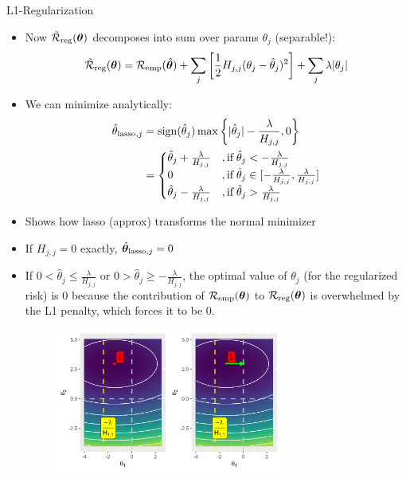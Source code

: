\documentclass[11pt,compress,t,notes=noshow, xcolor=table]{beamer}
\begin{document}
\begin{vbframe} {L1-Regularization}
\begin{itemize}
    \item Now $\mathcal{\tilde R}_{\text{reg}}(\bm{\theta})$ decomposes into sum over params $\theta_j$ (separable!):
  $$\mathcal{\tilde R}_{\text{reg}}(\bm{\theta}) = \mathcal{R}_{\text{emp}}(\hat{\bm{\theta}}) + \sum_j \left[ \frac{1}{2} H_{j,j} (\theta_j - \hat{\theta}_j)^2 \right] + \sum_j \lambda |\theta_j|$$
    \item We can minimize analytically:
     \begin{align*}\hat{\theta}_{\text{lasso},j} &= \operatorname{sign}(\hat{\theta}_j) \max \left\{ |\hat{\theta}_j| - \frac{\lambda}{H_{j,j}},0 \right\} \\
     &= \begin{cases} 
     \hat{\theta}_j + \frac{\lambda}{H_{j,j}} &, \text{if}   \;\hat{\theta}_j < -\frac{\lambda}{H_{j,j}} \\
       0 &, \text{if}   \;\hat{\theta}_j \in [-\frac{\lambda}{H_{j,j}}, \frac{\lambda}{H_{j,j}}] \\
     \hat{\theta}_j - \frac{\lambda}{H_{j,j}} &, \text{if}   \;\hat{\theta}_j > \frac{\lambda}{H_{j,j}} \\
     \end{cases}
     \end{align*}
  \item Shows how lasso (approx) transforms the normal minimizer
  \item If $H_{j,j} = 0$ exactly, $\hat{\bm{\theta}}_{\text{lasso},j} = 0$

\framebreak

\item If  $0 < \hat{\theta}_j \leq \frac{\lambda}{H_{j,j}}$ or $0 > \hat{\theta}_j \geq -\frac{\lambda}{H_{j,j}}$, the optimal value of $\theta_j$ (for the regularized risk) is $0$ because the contribution of  $\mathcal{R}_{\text{emp}}(\bm{\theta})$ to $\mathcal{R}_{\text{reg}}(\bm{\theta})$ is overwhelmed by the L1 penalty, which forces it to be $0$.

\begin{figure}
\includegraphics[width=0.7\textwidth]{figure/l1_reg_hess_01.png}\\
\end{figure}


\end{itemize}
\end{vbframe}
\end{document}
